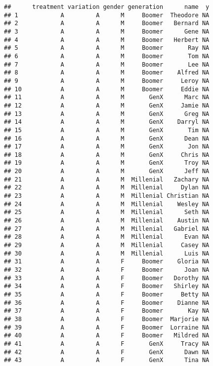 \documentclass[
]{article}
\begin{document}
\begin{verbatim}
##      treatment variation gender generation      name  y
## 1            A         A      M     Boomer  Theodore NA
## 2            A         A      M     Boomer   Bernard NA
## 3            A         A      M     Boomer      Gene NA
## 4            A         A      M     Boomer   Herbert NA
## 5            A         A      M     Boomer       Ray NA
## 6            A         A      M     Boomer       Tom NA
## 7            A         A      M     Boomer       Lee NA
## 8            A         A      M     Boomer    Alfred NA
## 9            A         A      M     Boomer     Leroy NA
## 10           A         A      M     Boomer     Eddie NA
## 11           A         A      M       GenX      Marc NA
## 12           A         A      M       GenX     Jamie NA
## 13           A         A      M       GenX      Greg NA
## 14           A         A      M       GenX    Darryl NA
## 15           A         A      M       GenX       Tim NA
## 16           A         A      M       GenX      Dean NA
## 17           A         A      M       GenX       Jon NA
## 18           A         A      M       GenX     Chris NA
## 19           A         A      M       GenX      Troy NA
## 20           A         A      M       GenX      Jeff NA
## 21           A         A      M  Millenial   Zachary NA
## 22           A         A      M  Millenial     Dylan NA
## 23           A         A      M  Millenial Christian NA
## 24           A         A      M  Millenial    Wesley NA
## 25           A         A      M  Millenial      Seth NA
## 26           A         A      M  Millenial    Austin NA
## 27           A         A      M  Millenial   Gabriel NA
## 28           A         A      M  Millenial      Evan NA
## 29           A         A      M  Millenial     Casey NA
## 30           A         A      M  Millenial      Luis NA
## 31           A         A      F     Boomer    Gloria NA
## 32           A         A      F     Boomer      Joan NA
## 33           A         A      F     Boomer   Dorothy NA
## 34           A         A      F     Boomer   Shirley NA
## 35           A         A      F     Boomer     Betty NA
## 36           A         A      F     Boomer    Dianne NA
## 37           A         A      F     Boomer       Kay NA
## 38           A         A      F     Boomer  Marjorie NA
## 39           A         A      F     Boomer  Lorraine NA
## 40           A         A      F     Boomer   Mildred NA
## 41           A         A      F       GenX     Tracy NA
## 42           A         A      F       GenX      Dawn NA
## 43           A         A      F       GenX      Tina NA

\end{verbatim}
\end{document}
